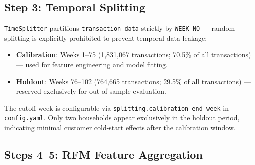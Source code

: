 \documentclass[conference]{IEEEtran}
\begin{document}
\begin{table}[H]
\centering
\caption{Household-level RFM summary --- calibration period (Weeks 1--75).}
\label{tab:rfm_summary}
\end{table}

\subsection{Step 3: Temporal Splitting}
\label{sec:split}

\texttt{TimeSplitter} partitions \texttt{transaction\_data}
strictly by \texttt{WEEK\_NO} — random splitting is explicitly
prohibited to prevent temporal data leakage:

\begin{itemize}
  \item \textbf{Calibration}: Weeks 1--75
      (1,831,067 transactions; 70.5\% of all transactions)
      --- used for feature engineering and model fitting.

\item \textbf{Holdout}: Weeks 76--102
      (764,665 transactions; 29.5\% of all transactions)
      --- reserved exclusively for out-of-sample evaluation.
\end{itemize}

The cutoff week is configurable via
\texttt{splitting.calibration\_end\_week} in
\texttt{config.yaml}.
Only two households appear exclusively in the holdout
period, indicating minimal customer cold-start effects
after the calibration window.

\subsection{Steps 4--5: RFM Feature Aggregation}
\end{document}
